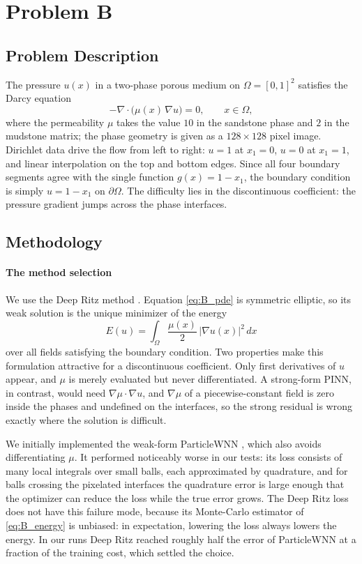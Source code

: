 \chapter{Problem B}
\label{ch:problem_B}
%
\section{Problem Description}
The pressure $u(x)$ in a two-phase porous medium on $\Omega = [0,1]^2$
satisfies the Darcy equation
\begin{equation}
    -\nabla\cdot\big(\mu(x)\,\nabla u\big) = 0, \qquad x \in \Omega,
    \label{eq:B_pde}
\end{equation}
where the permeability $\mu$ takes the value $10$ in the sandstone phase
and $2$ in the mudstone matrix; the phase geometry is given as a
$128\times128$ pixel image. Dirichlet data drive the flow from left to
right: $u = 1$ at $x_1 = 0$, $u = 0$ at $x_1 = 1$, and linear interpolation
on the top and bottom edges. Since all four boundary segments agree with
the single function $g(x) = 1 - x_1$, the boundary condition is simply
$u = 1 - x_1$ on $\partial\Omega$. The difficulty lies in the discontinuous
coefficient: the pressure gradient jumps across the phase interfaces.
%
\section{Methodology}
%
\subsubsection{The method selection}
We use the Deep Ritz method \cite{e2018deepritz}. Equation \eqref{eq:B_pde}
is symmetric elliptic, so its weak solution is the unique minimizer of the
energy
\begin{equation}
    E(u) = \int_\Omega \frac{\mu(x)}{2}\,|\nabla u(x)|^2 \, dx
    \label{eq:B_energy}
\end{equation}
over all fields satisfying the boundary condition. Two properties make this
formulation attractive for a discontinuous coefficient. Only first
derivatives of $u$ appear, and $\mu$ is merely evaluated but never
differentiated. A strong-form PINN, in contrast, would need
$\nabla\mu\cdot\nabla u$, and $\nabla\mu$ of a piecewise-constant field is
zero inside the phases and undefined on the interfaces, so the strong
residual is wrong exactly where the solution is difficult.

We initially implemented the weak-form ParticleWNN
\cite{zang2023particlewnn}, which also avoids differentiating $\mu$. It
performed noticeably worse in our tests: its loss consists of many local
integrals over small balls, each approximated by quadrature, and for balls
crossing the pixelated interfaces the quadrature error is large enough that
the optimizer can reduce the loss while the true error grows. The Deep Ritz
loss does not have this failure mode, because its Monte-Carlo estimator of
\eqref{eq:B_energy} is unbiased: in expectation, lowering the loss always
lowers the energy. In our runs Deep Ritz reached roughly half the error of
ParticleWNN at a fraction of the training cost, which settled the choice.
%
